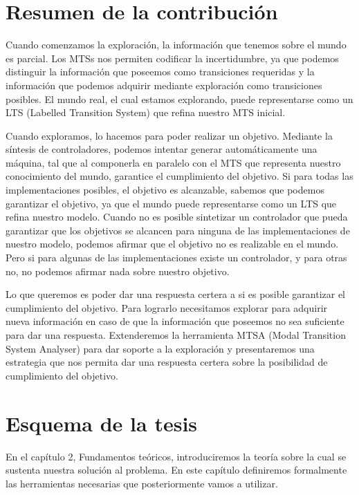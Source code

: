 \section{Resumen de la contribución}

Cuando comenzamos la exploración, la información que tenemos sobre el mundo es parcial. Los MTSs nos permiten codificar 
la incertidumbre, ya que podemos distinguir la información que poseemos como transiciones requeridas y la información 
que podemos adquirir mediante exploración como transiciones posibles. El mundo real, el cual estamos explorando, puede 
representarse como un LTS (Labelled Transition System) que refina nuestro MTS inicial.

\vspace{\baselineskip}
Cuando exploramos, lo hacemos para poder realizar un objetivo. Mediante la síntesis de controladores, podemos intentar 
generar automáticamente una máquina, tal que al componerla en paralelo con el MTS que representa nuestro conocimiento 
del mundo, garantice el cumplimiento del objetivo. 
Si para todas las implementaciones posibles, el objetivo es alcanzable, sabemos que podemos garantizar el objetivo, ya 
que el mundo puede representarse como un LTS que refina nuestro modelo. 
Cuando no es posible sintetizar un controlador que pueda garantizar que los objetivos se alcancen para ninguna de las 
implementaciones de nuestro modelo, podemos afirmar que el objetivo no es realizable en el mundo. Pero si para algunas 
de las implementaciones existe un controlador, y para otras no, no podemos afirmar nada sobre nuestro objetivo.

\vspace{\baselineskip}
Lo que queremos es poder dar una respuesta certera a si es posible garantizar el cumplimiento del objetivo. 
Para lograrlo necesitamos explorar para adquirir nueva información en caso de que la información que poseemos no sea 
suficiente para dar una respuesta. Extenderemos la herramienta MTSA (Modal Transition System Analyser) para dar soporte 
a la exploración y presentaremos una estrategia que nos permita dar una respuesta certera sobre la posibilidad de 
cumplimiento del objetivo.

\section{Esquema de la tesis}

En el capítulo 2, Fundamentos teóricos, introduciremos la teoría sobre la cual se sustenta nuestra solución al problema. 
En este capítulo definiremos formalmente las herramientas necesarias que posteriormente vamos a utilizar.

